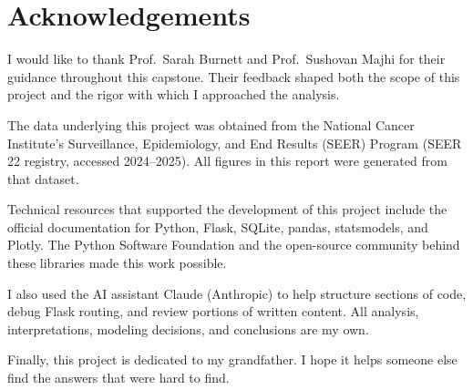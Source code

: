\documentclass[12pt]{article}
\newenvironment{acknowledgements}{%
    \section*{Acknowledgements}%
    \addcontentsline{toc}{section}{Acknowledgements}%
}{\par\vspace{1em}}
\begin{document}
\begin{acknowledgements}
I would like to thank Prof.\ Sarah Burnett and Prof.\ Sushovan Majhi for their
guidance throughout this capstone. Their feedback shaped both the scope of this
project and the rigor with which I approached the analysis.

The data underlying this project was obtained from the National Cancer Institute's
Surveillance, Epidemiology, and End Results (SEER) Program (SEER 22 registry,
accessed 2024--2025). All figures in this report were generated from that dataset.

Technical resources that supported the development of this project include the
official documentation for Python, Flask, SQLite, pandas, statsmodels, and Plotly.
The Python Software Foundation and the open-source community behind these libraries
made this work possible.

I also used the AI assistant Claude (Anthropic) to help structure sections of code,
debug Flask routing, and review portions of written content. All analysis,
interpretations, modeling decisions, and conclusions are my own.

Finally, this project is dedicated to my grandfather. I hope it helps someone else
find the answers that were hard to find.
\end{acknowledgements}

\newpage

\begin{abstract}
\noindent
Prostate cancer is the most commonly diagnosed non-skin cancer among American men,
yet survival outcomes differ dramatically based on race, geography, and stage of
diagnosis --- disparities that aggregate national statistics routinely obscure.
Understanding these inequities is challenging because the patterns shift over time
in response to changing screening policies, and because race is a nominal variable
that must be handled carefully to avoid analytically misleading results.
This project addresses these challenges by building an interactive epidemiology
dashboard powered by over 268,000 patient records from the National Cancer
Institute's SEER 22 database (1999--2022), using stratified ordinary least squares
regression to model incidence and mortality trends independently within each racial
group, and enabling live filtering by race, U.S.\ state, year range, and cancer stage.
The dashboard reveals three critical findings: national incidence declined 48\%
following the 2012 USPSTF screening recommendation, but late-stage diagnoses rose
50\% over the same period; Non-Hispanic Black men face 60\% higher incidence and
109\% higher mortality than White men, a gap that persists after controlling for age
and stage; and a 62-percentage-point survival gap separates men diagnosed at the
localized stage from those diagnosed at the distant stage --- a difference that is
directly tied to inequitable access to screening.
\end{abstract}
\end{document}
